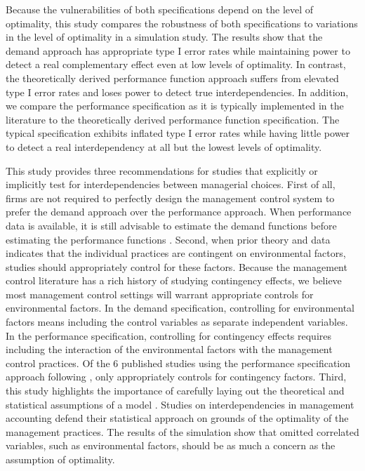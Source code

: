 \documentclass[12pt]{article}
\begin{document}
Because the vulnerabilities of both specifications depend on the level of optimality, this study compares the robustness of both specifications to variations in the level of optimality in a simulation study. The results show that the demand approach has appropriate type I error rates while maintaining power to detect a real complementary effect even at low levels of optimality. In contrast, the theoretically derived performance function approach suffers from elevated type I error rates and loses power to detect true interdependencies. In addition, we compare the performance specification as it is typically implemented in the literature to the theoretically derived performance function specification. The typical specification exhibits inflated type I error rates while having little power to detect a real interdependency at all but the lowest levels of optimality.

This study provides three recommendations for studies that explicitly or implicitly test for interdependencies between managerial choices. First of all, firms are not required to perfectly design the management control system to prefer the demand approach over the performance approach. When performance data is available, it is still advisable to estimate the demand functions before estimating the performance functions \citep{Aral2012, Cassiman2006}. Second, when prior theory and data indicates that the individual practices are contingent on environmental factors, studies should appropriately control for these factors. Because the management control literature has a rich history of studying contingency effects, we believe most management control settings will warrant appropriate controls for environmental factors. In the demand specification, controlling for environmental factors means including the control variables as separate independent variables. In the performance specification, controlling for contingency effects requires including the interaction of the environmental factors with the management control practices. Of the 6 published studies using the performance specification approach following \citet{Grabner2013}, only \citet{Bedford2016,Bedford2018PerformanceFirms} appropriately controls for contingency factors. Third, this study highlights the importance of carefully laying out the theoretical and statistical assumptions of a model \citep{Chenhall2007}. Studies on interdependencies in management accounting defend their statistical approach on grounds of the optimality of the management practices. The results of the simulation show that omitted correlated variables, such as environmental factors, should be as much a concern as the assumption of optimality.
\end{document}
